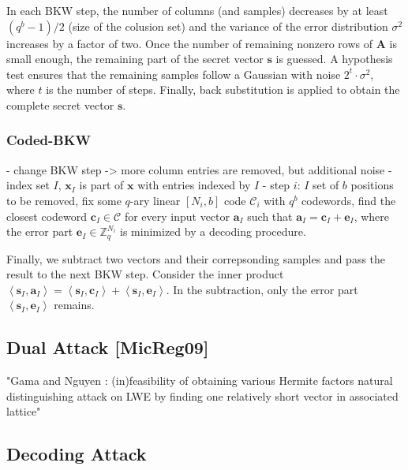 In each BKW step, the number of columns (and samples) decreases by at least $(q^b - 1)/2$ (size of the colusion set) and the variance of the error distribution $\sigma^2$ increases by a factor of two. Once the number of remaining nonzero rows of $\mathbf{A}$ is small enough, the remaining part of the secret vector $\mathbf{s}$ is guessed. A hypothesis test ensures that the remaining samples follow a Gaussian with noise $2^t\cdot \sigma^2$, where $t$ is the number of steps. Finally, back substitution is applied to obtain the complete secret vector $\mathbf{s}$. %

\subsubsection*{Coded-BKW \cite{GJS15}}
- change BKW step -> more column entries are removed, but additional noise
- index set $I$, $\mathbf{x}_I$ is part of $\mathbf{x}$ with entries indexed by $I$
- step $i$: $I$ set of $b$ positions to be removed, fix some $q$-ary linear $\left[N_i, b\right]$ code $\mathcal{C}_i$ with $q^b$ codewords, find the closest codeword $\mathbf{c}_I \in \mathcal{C}$ for every input vector $\mathbf{a}_I$ such that $\mathbf{a}_I = \mathbf{c}_I + \mathbf{e}_I$, where the error part $\mathbf{e}_I \in \mathbb{Z}_q^{N_i}$ is minimized by a decoding procedure.

Finally, we subtract two vectors and their correpsonding samples and pass the result to the next BKW step. Consider the inner product$\left\langle \mathbf{s}_{I}, \mathbf{a}_{I} \right\rangle = \left\langle \mathbf{s}_{I}, \mathbf{c}_{I} \right\rangle + \left\langle \mathbf{s}_{I}, \mathbf{e}_{I} \right\rangle$. In the subtraction, only the error part $\left\langle \mathbf{s}_{I}, \mathbf{e}_{I} \right\rangle$ remains. 




\subsection{Dual Attack [MicReg09]}
"Gama and Nguyen \cite{GN08b}: (in)feasibility of obtaining various Hermite factors
natural distinguishing attack on LWE by finding one relatively short vector in associated lattice"

\subsection{Decoding Attack \cite{LP11}} \label{sec:decoding}

